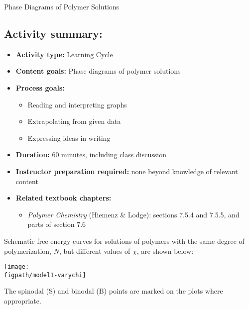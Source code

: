 \begin{activity}{Phase Diagrams of Polymer Solutions}
\begin{instructornotes}
	\subsection*{Activity summary:}
	\begin{itemize}
		\item \textbf{Activity type:} Learning Cycle
		\item \textbf{Content goals:} Phase diagrams of polymer solutions
		\item \textbf{Process goals:} %
			\begin{itemize}
				\item Reading and interpreting graphs
				\item Extrapolating from given data
				\item Expressing ideas in writing
			\end{itemize}
		\item \textbf{Duration:} 60 minutes, including class discussion
		\item \textbf{Instructor preparation required:} none beyond knowledge of relevant content
		\item \textbf{Related textbook chapters:}
			\begin{itemize}
				\item \emph{Polymer Chemistry} (Hiemenz \& Lodge): sections 7.5.4 and 7.5.5, and parts of section 7.6
			\end{itemize}
	\end{itemize}

\end{instructornotes}



\begin{model}
\label{\labelbase:mdl:spinodalbinodal}

	Schematic free energy curves for solutions of polymers with the same degree of polymerization, $N$, but different values of $\chi$, are shown below:
	
	\centerline{\texttt{[image: \\figpath/model1-varychi]}}
	
	The spinodal (S) and binodal (B) points are marked on the plots where appropriate.
\end{model}

\begin{ctqs}


\end{ctqs}
\end{activity}
